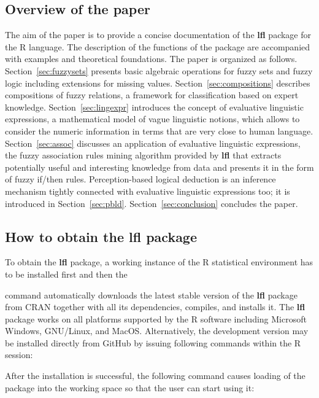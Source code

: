 \documentclass[review]{elsarticle}
\newcommand{\pkg}[1]{\textbf{#1}}
\newcommand{\proglang}[1]{#1}
\newcommand{\R}{\proglang{R}}
\begin{document}
\subsection{Overview of the paper}

The aim of the paper is to provide a concise documentation of the \pkg{lfl} package for the \R{} language. The description of the functions of the package are accompanied with examples and theoretical foundations. The paper is organized as follows. Section~\ref{sec:fuzzysets} presents basic algebraic operations for fuzzy sets and fuzzy logic including extensions for missing values. Section~\ref{sec:compositions} describes compositions of fuzzy relations, a framework for classification based on expert knowledge. Section~\ref{sec:lingexpr} introduces the concept of evaluative linguistic expressions, a mathematical model of vague linguistic notions, which allows to consider the numeric information in terms that are very close to human language. Section~\ref{sec:assoc} discusses an application of evaluative linguistic expressions, the fuzzy association rules mining algorithm provided by \pkg{lfl} that extracts potentially useful and interesting knowledge from data and presents it in the form of fuzzy if/then rules. Perception-based logical deduction is an inference mechanism tightly connected with evaluative linguistic expressions too; it is introduced in Section~\ref{sec:pbld}. Section~\ref{sec:conclusion} concludes the paper.




\subsection[How to obtain the lfl package]{How to obtain the \pkg{lfl} package} \label{sec:obtaining}

To obtain the \pkg{lfl} package, a working instance of the \R{} statistical environment has to be installed
first and then the
%

%
command automatically downloads the latest stable version of the \pkg{lfl} package from CRAN together with all
its dependencies, compiles, and installs it. The \pkg{lfl} package works on all platforms supported by
the \R{} software including Microsoft Windows, GNU/Linux, and MacOS. Alternatively, the development
version may be installed directly from GitHub by issuing following commands within the R session:
%

%
After the installation is successful, the following command
causes loading of the package into the working space so that the user can start using it:
%

\end{document}
